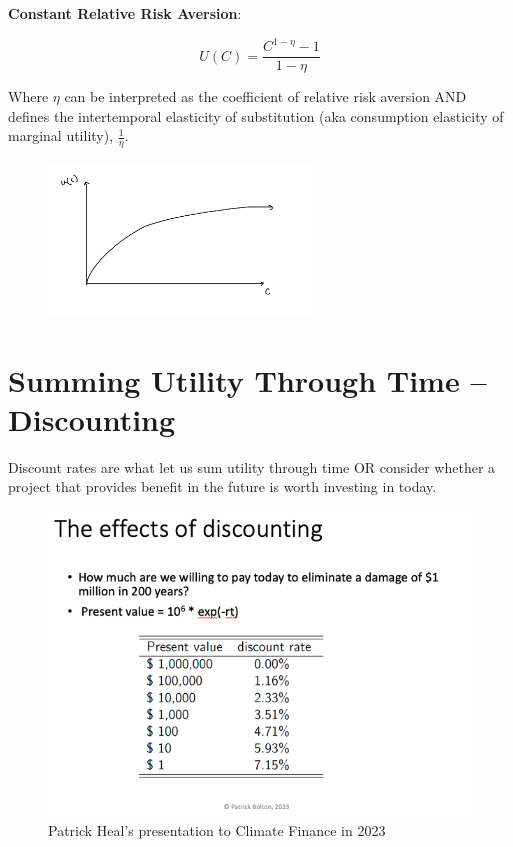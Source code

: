 \documentclass{article}
\begin{document}
\textbf{Constant Relative Risk Aversion}:

$$U(C) = \frac{C^{1-\eta} - 1}{1 - \eta}$$

Where $\eta$ can be interpreted as the coefficient of relative risk aversion AND defines the intertemporal elasticity of substitution (aka consumption elasticity of marginal utility), $\frac{1}{\eta}$. \\

\begin{figure}[htp]
    \centering
    \includegraphics[width=7cm]{Screen Shot 2023-02-13 at 3.40.54 PM.png}
    \caption{}
\end{figure}


\section{Summing Utility Through Time -- Discounting}
Discount rates are what let us sum utility through time OR consider whether a project that provides benefit in the future is worth investing in today. 

\begin{figure}[htp]
    \centering
    \includegraphics[width=12cm]{Screen Shot 2023-02-13 at 3.18.01 PM.png}
    \caption{Patrick Heal's presentation to Climate Finance in 2023}
\end{figure}
\end{document}
